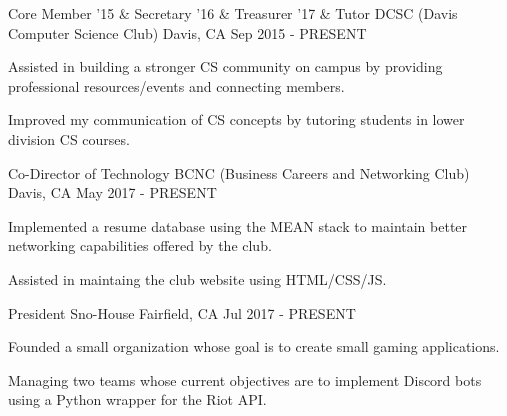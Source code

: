 

\begin{cventries}

  \cventry
    {Core Member '15 \& Secretary '16 \& Treasurer '17 \& Tutor} %
    {DCSC (Davis Computer Science Club)} %
    {Davis, CA} %
    {Sep 2015 - PRESENT} %
    {
      \begin{cvitems} %
        \item {Assisted in building a stronger CS community on campus by providing professional resources/events and connecting members.}
        \item {Improved my communication of CS concepts by tutoring students in lower division CS courses.}
      \end{cvitems}
    }

  \cventry
    {Co-Director of Technology} %
    {BCNC (Business Careers and Networking Club)} %
    {Davis, CA} %
    {May 2017 - PRESENT} %
    {
      \begin{cvitems} %
        \item {Implemented a resume database using the MEAN stack to maintain better networking capabilities offered by the club.}
        \item {Assisted in maintaing the club website using HTML/CSS/JS.}
      \end{cvitems}
    }

  \cventry
    {President} %
    {Sno-House} %
    {Fairfield, CA} %
    {Jul 2017 - PRESENT} %
    {
      \begin{cvitems} %
          \item {Founded a small organization whose goal is to create small gaming applications.}
          \item {Managing two teams whose current objectives are to implement Discord bots using a Python wrapper for the Riot API.}
      \end{cvitems}
    }
\end{cventries}

